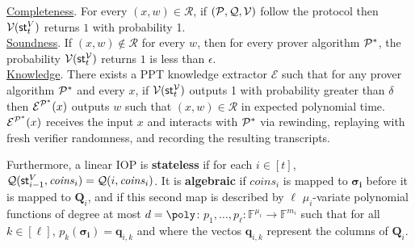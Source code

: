 \begin{definition} 
\noindent \underline{Completeness}. For every $(x, w) \in \mathcal{R}$, if $(\mathcal{P}, \mathcal{Q}, \mathcal{V})$ follow the protocol then $\mathcal{V}(\textsf{st}^V_t)$ returns $1$ with probability 1. \\

\noindent \underline{Soundness}. If $(x, w) \notin \mathcal{R}$ for every $w$, then for every prover algorithm $\mathcal{P}^*$, %
the probability $\mathcal{V}(\textsf{st}^\mathcal{V}_t)$ returns $1$ is less than $\epsilon$. \\

\noindent \underline{Knowledge}. There exists a PPT knowledge extractor $\mathcal{E}$ such that for any prover algorithm $\mathcal{P}^*$ and every $x$, if $\mathcal{V}(\textsf{st}^\mathcal{V}_t)$ outputs 1%
with probability greater than $\delta$ then $\mathcal{E}^{\mathcal{P}^*}(x)$ outputs $w$ such that $(x, w) \in \mathcal{R}$ in expected polynomial time. $\mathcal{E}^{\mathcal{P}^*}(x)$ receives the input $x$ and interacts with $\mathcal{P}^*$ via rewinding, replaying with fresh verifier randomness, and recording the resulting transcripts. %

Furthermore, a linear IOP is \textbf{stateless} if for each $i \in [t]$, $\mathcal{Q}(\textsf{st}^V_{i-1}, \mathit{coins}_i) = \mathcal{Q}(i, \mathit{coins}_i)$. It is \textbf{algebraic} if $\textit{coins}_i$ is mapped to $\boldsymbol{\sigma_i}$ before it is mapped to $\boldsymbol{Q}_i$, and if this second map is described by $\ell$ $\mu_i$-variate polynomial functions of degree at most $d = \poly$: $p_1, \ldots, p_\ell : \mathbb{F}^{\mu_i} \rightarrow \mathbb{F}^{m_i}$ such that for all $k \in [\ell]$, $p_k(\boldsymbol{\sigma_i}) = \mathbf{q}_{i,k}$ and where the vectos $\mathbf{q}_{i,k}$ represent the columns of $\mathbf{Q}_i$.

\end{definition} 


